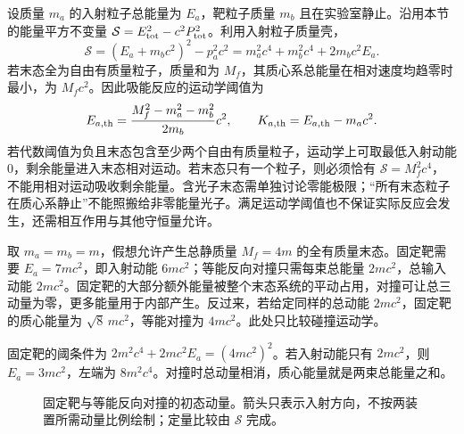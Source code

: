 设质量 $m_a$ 的入射粒子总能量为 $E_a$，靶粒子质量 $m_b$ 且在实验室静止。沿用本节的能量平方不变量 $\mathcal S=E_{\rm tot}^2-c^2P_{\rm tot}^2$。利用入射粒子质量壳，
\[
\mathcal S=(E_a+m_bc^2)^2-p_a^2c^2
=m_a^2c^4+m_b^2c^4+2m_bc^2E_a.
\]
若末态全为自由有质量粒子，质量和为 $M_f$，其质心系总能量在相对速度均趋零时最小，为 $M_fc^2$。因此吸能反应的运动学阈值为
\begin{equation}\label{eq:sr-threshold}
E_{a,\rm th}=\frac{M_f^2-m_a^2-m_b^2}{2m_b}c^2,\qquad
K_{a,\rm th}=E_{a,\rm th}-m_ac^2.
\end{equation}
若代数阈值为负且末态包含至少两个自由有质量粒子，运动学上可取最低入射动能 $0$，剩余能量进入末态相对运动。若末态只有一个粒子，则必须恰有 $\mathcal S=M_f^2c^4$，不能用相对运动吸收剩余能量。含光子末态需单独讨论零能极限；“所有末态粒子在质心系静止”不能照搬给非零能量光子。满足运动学阈值也不保证实际反应会发生，还需相互作用与其他守恒量允许。

\begin{example}
取 $m_a=m_b=m$，假想允许产生总静质量 $M_f=4m$ 的全有质量末态。固定靶需要 $E_a=7mc^2$，即入射动能 $6mc^2$；等能反向对撞只需每束总能量 $2mc^2$，总输入动能 $2mc^2$。固定靶的大部分额外能量被整个末态系统的平动占用，对撞可让总三动量为零，更多能量用于内部产生。反过来，若给定同样的总动能 $2mc^2$，固定靶的质心能量为 $\sqrt{8}\,mc^2$，等能对撞为 $4mc^2$。此处只比较碰撞运动学。

固定靶的阈条件为 $2m^2c^4+2mc^2E_a=(4mc^2)^2$。若入射动能只有 $2mc^2$，则 $E_a=3mc^2$，左端为 $8m^2c^4$。对撞时总动量相消，质心能量就是两束总能量之和。
\end{example}

\begin{figure}[htbp]\centering
{}
\caption{固定靶与等能反向对撞的初态动量。箭头只表示入射方向，不按两装置所需动量比例绘制；定量比较由 $\mathcal S$ 完成。}\label{fig:sr-collider}
\end{figure}

